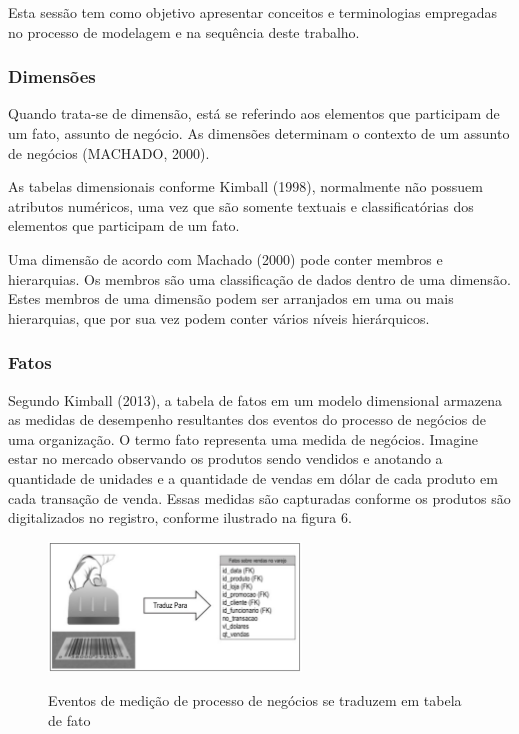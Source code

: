 Esta sess\~{a}o tem como objetivo apresentar conceitos e terminologias empregadas no processo de modelagem e na sequência deste trabalho. 

\subsubsection{Dimens\~{o}es}

Quando trata-se de dimens\~{a}o, est\'{a} se referindo aos elementos que participam de um fato, assunto de neg\'{o}cio. As dimens\~{o}es determinam o contexto de um assunto de neg\'{o}cios (MACHADO, 2000).

As tabelas dimensionais conforme Kimball (1998), normalmente n\~{a}o possuem atributos num\'{e}ricos, uma vez que s\~{a}o somente textuais e classificat\'{o}rias dos elementos que participam de um fato.

Uma dimens\~{a}o de acordo com Machado (2000) pode conter membros e hierarquias. Os membros s\~{a}o uma classifica\c{c}\~{a}o de dados dentro de uma dimens\~{a}o. Estes membros de uma dimens\~{a}o podem ser arranjados em uma ou mais hierarquias, que por sua vez podem conter v\'{a}rios n\'{i}veis hier\'{a}rquicos.

\subsubsection{Fatos}

Segundo Kimball (2013), a tabela de fatos em um modelo dimensional armazena as medidas de desempenho resultantes dos eventos do processo de neg\'{o}cios de uma organiza\c{c}\~{a}o.
O termo fato representa uma medida de neg\'{o}cios. Imagine estar no mercado observando os produtos sendo vendidos e anotando a quantidade de unidades e a quantidade de vendas em d\'{o}lar de cada produto em cada transa\c{c}\~{a}o de venda. Essas medidas s\~{a}o capturadas conforme os produtos s\~{a}o digitalizados no registro, conforme ilustrado na figura 6.

\begin{figure}[H]
	\vspace*{0,2cm}
    \centering
    \caption{Eventos de medi\c{c}\~{a}o de processo de neg\'{o}cios se traduzem em tabela de fato}
    \includegraphics[width=0.6\textwidth]{./04-figuras/figura-06}
    \label{fig:ilustfig06}
\end{figure}
\vspace*{-0,9cm}
{\raggedright {}}\\

